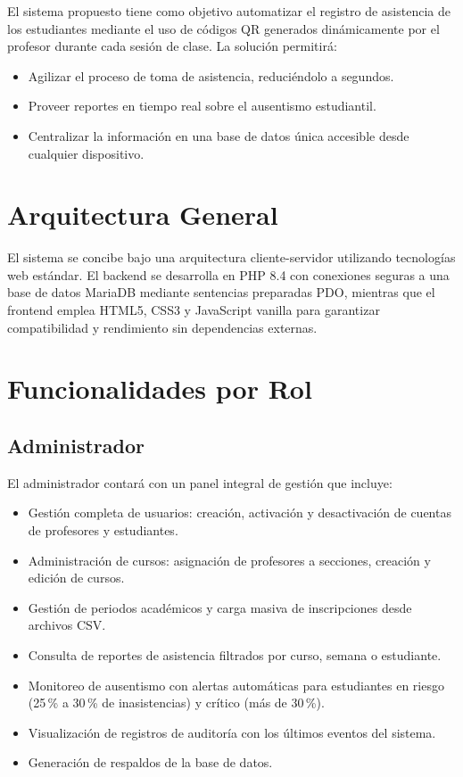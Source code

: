 \documentclass[12pt, letterpaper, oneside]{report}
\begin{document}
El sistema propuesto tiene como objetivo automatizar el registro de asistencia de los estudiantes mediante el uso de c\'odigos QR generados din\'amicamente por el profesor durante cada sesi\'on de clase. La soluci\'on permitir\'a:

\begin{itemize}
  \item Agilizar el proceso de toma de asistencia, reduci\'endolo a segundos.
  \item Proveer reportes en tiempo real sobre el ausentismo estudiantil.
  \item Centralizar la informaci\'on en una base de datos \'unica accesible desde cualquier dispositivo.
\end{itemize}

\section{Arquitectura General}

El sistema se concibe bajo una arquitectura cliente-servidor utilizando tecnolog\'ias web est\'andar. El backend se desarrolla en PHP 8.4 con conexiones seguras a una base de datos MariaDB mediante sentencias preparadas PDO, mientras que el frontend emplea HTML5, CSS3 y JavaScript vanilla para garantizar compatibilidad y rendimiento sin dependencias externas.

\section{Funcionalidades por Rol}

\subsection{Administrador}

El administrador contar\'a con un panel integral de gesti\'on que incluye:

\begin{itemize}
  \item Gesti\'on completa de usuarios: creaci\'on, activaci\'on y desactivaci\'on de cuentas de profesores y estudiantes.
  \item Administraci\'on de cursos: asignaci\'on de profesores a secciones, creaci\'on y edici\'on de cursos.
  \item Gesti\'on de periodos acad\'emicos y carga masiva de inscripciones desde archivos CSV.
  \item Consulta de reportes de asistencia filtrados por curso, semana o estudiante.
  \item Monitoreo de ausentismo con alertas autom\'aticas para estudiantes en riesgo (25\,\% a 30\,\% de inasistencias) y cr\'itico (m\'as de 30\,\%).
  \item Visualizaci\'on de registros de auditor\'ia con los \'ultimos eventos del sistema.
  \item Generaci\'on de respaldos de la base de datos.
\end{itemize}
\end{document}
